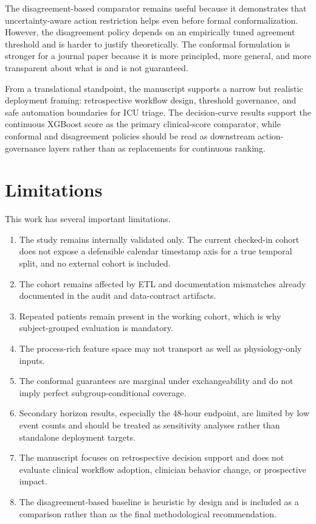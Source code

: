 \documentclass[unnumsec,webpdf,contemporary,large,numbered,nocrop]{oup-authoring-template}
\begin{document}
The disagreement-based comparator remains useful because it demonstrates that uncertainty-aware action restriction helps even before formal conformalization. However, the disagreement policy depends on an empirically tuned agreement threshold and is harder to justify theoretically. The conformal formulation is stronger for a journal paper because it is more principled, more general, and more transparent about what is and is not guaranteed.

From a translational standpoint, the manuscript supports a narrow but realistic deployment framing: retrospective workflow design, threshold governance, and safe automation boundaries for ICU triage. The decision-curve results support the continuous XGBoost score as the primary clinical-score comparator, while conformal and disagreement policies should be read as downstream action-governance layers rather than as replacements for continuous ranking.

\section{Limitations}
This work has several important limitations.
\begin{enumerate}
\item The study remains internally validated only. The current checked-in cohort does not expose a defensible calendar timestamp axis for a true temporal split, and no external cohort is included.
\item The cohort remains affected by ETL and documentation mismatches already documented in the audit and data-contract artifacts.
\item Repeated patients remain present in the working cohort, which is why subject-grouped evaluation is mandatory.
\item The process-rich feature space may not transport as well as physiology-only inputs.
\item The conformal guarantees are marginal under exchangeability and do not imply perfect subgroup-conditional coverage.
\item Secondary horizon results, especially the 48-hour endpoint, are limited by low event counts and should be treated as sensitivity analyses rather than standalone deployment targets.
\item The manuscript focuses on retrospective decision support and does not evaluate clinical workflow adoption, clinician behavior change, or prospective impact.
\item The disagreement-based baseline is heuristic by design and is included as a comparison rather than as the final methodological recommendation.
\end{enumerate}
\end{document}
